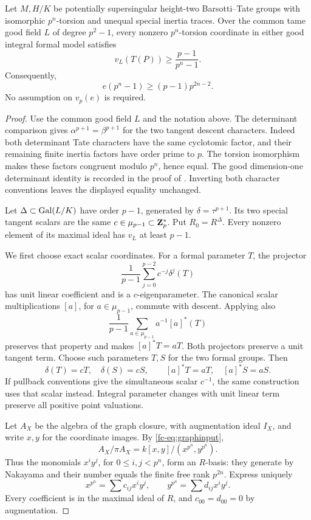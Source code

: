 \begin{proposition}\label{fc-thm:valuation}
Let \(M,H/K\) be potentially supersingular height-two Barsotti--Tate
groups with isomorphic \(p^n\)-torsion and unequal special inertia traces.
Over the common tame good field $L$ of degree $p^2-1$, every nonzero $p^n$-torsion coordinate in either good integral formal model satisfies
\[
 v_L(T(P))\ge\frac{p-1}{p^n-1}.
\]
Consequently,
\begin{equation}\label{fc-eq:mainbound}
 e(p^n-1)\geq(p-1)p^{2n-2}.
\end{equation}
No assumption on \(v_p(e)\) is required.
\end{proposition}
\begin{proof}
Use the common good field \(L\) and the notation above. The determinant
comparison gives
\(\alpha^{p+1}=\beta^{p+1}\) for the two tangent descent characters.
Indeed both determinant Tate characters have the same cyclotomic factor,
and their remaining finite inertia factors have order prime to \(p\).
The torsion isomorphism makes these factors congruent modulo \(p^n\),
hence equal. The good dimension-one determinant identity is recorded in
the proof of \citet[Proposition~5.2.2]{Liu2007}. Inverting both character
conventions leaves the displayed equality unchanged.

Let \(\Delta\subset\operatorname{Gal}(L/K)\) have order \(p-1\), generated by
\(\delta=\tau^{p+1}\). Its two special tangent scalars are the same
\(c\in\mu_{p-1}\subset\mathbf Z_p^*\). Put \(R_0=R^\Delta\). Every nonzero
element of its maximal ideal has \(v_L\) at least \(p-1\).

We first choose exact scalar coordinates. For a formal parameter \(T\),
the projector
\[
 \frac1{p-1}\sum_{j=0}^{p-2}c^{-j}\delta^j(T)
\]
has unit linear coefficient and is a \(c\)-eigenparameter. The canonical
scalar multiplications \([a]\), for \(a\in\mu_{p-1}\), commute with
descent. Applying also
\[
 \frac1{p-1}\sum_{a\in\mu_{p-1}}a^{-1}[a]^*(T)
\]
preserves that property and makes \([a]^*T=aT\). Both projectors preserve
a unit tangent term. Choose such parameters \(T,S\) for the two formal
groups. Then
\[
 \delta(T)=cT,\quad\delta(S)=cS,\qquad
 [a]^*T=aT,\quad[a]^*S=aS.
\]
If pullback conventions give the simultaneous scalar \(c^{-1}\), the same
construction uses that scalar instead. Integral parameter changes with
unit linear term preserve all positive point valuations.

Let \(A_X\) be the algebra of the graph closure, with augmentation ideal
\(I_X\), and write \(x,y\) for the coordinate images. By
\eqref{fc-eq:graphinput},
\[
 A_X/\pi A_X=k[x,y]/(x^{p^n},y^{p^n}).
\]
Thus the monomials \(x^iy^j\), for \(0\leq i,j<p^n\), form an
\(R\)-basis: they generate by Nakayama and their number equals the
finite free rank \(p^{2n}\). Express uniquely
\[
 x^{p^n}=\sum c_{ij}x^iy^j,
 \qquad y^{p^n}=\sum d_{ij}x^iy^j.
\]
Every coefficient is in the maximal ideal of \(R\), and
\(c_{00}=d_{00}=0\) by augmentation.


\end{proof}
